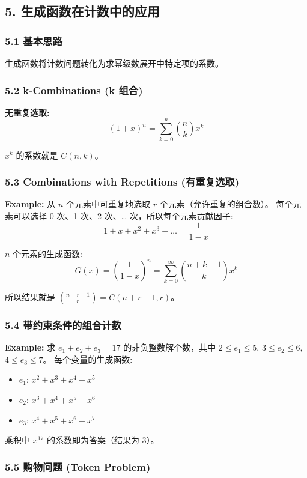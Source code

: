\documentclass[10pt,a4paper,openany]{ctexbook}
\theoremstyle{definition}
\theoremstyle{remark}
\begin{document}
\vspace{-2pt}

\subsection{5. 生成函数在计数中的应用}

\subsubsection{5.1 基本思路}

生成函数将计数问题转化为求幂级数展开中特定项的系数。
\subsubsection{5.2 k-Combinations (k 组合)}

\textbf{无重复选取:}
\[
(1+x)^n = \sum_{k=0}^n \binom{n}{k} x^k
\]

$x^k$ 的系数就是 $C(n,k)$。
\subsubsection{5.3 Combinations with Repetitions (有重复选取)}

\textbf{Example:} 从 $n$ 个元素中可重复地选取 $r$ 个元素（允许重复的组合数）。
每个元素可以选择 0 次、1 次、2 次、… 次，所以每个元素贡献因子:
\[
1 + x + x^2 + x^3 + \dots = \frac{1}{1-x}
\]

$n$ 个元素的生成函数:
\[
G(x) = \left(\frac{1}{1-x}\right)^n = \sum_{k=0}^\infty \binom{n+k-1}{k} x^k
\]

所以结果就是 $\binom{n+r-1}{r} = C(n+r-1, r)$。
\subsubsection{5.4 带约束条件的组合计数}

\textbf{Example:} 求 $e_1 + e_2 + e_3 = 17$ 的非负整数解个数，其中 $2 \le e_1 \le 5$, $3 \le e_2 \le 6$, $4 \le e_3 \le 7$。
每个变量的生成函数:
\begin{itemize}
\item $e_1$: $x^2 + x^3 + x^4 + x^5$
\item $e_2$: $x^3 + x^4 + x^5 + x^6$
\item $e_3$: $x^4 + x^5 + x^6 + x^7$

\end{itemize}

乘积中 $x^{17}$ 的系数即为答案（结果为 3）。
\subsubsection{5.5 购物问题 (Token Problem)}
\end{document}
